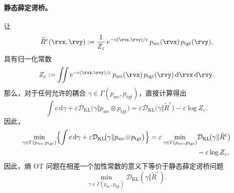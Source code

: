 \paragraph{静态薛定谔桥。}
让
\[
  \widetilde R^\varepsilon(\rvx,\rvy)
  := \frac{1}{Z_\varepsilon}\,e^{-c(\rvx,\rvy)/\varepsilon}\,p_{\mathrm{src}}(\rvx)\,p_{\mathrm{tgt}}(\rvy),
\]
具有归一化常数
\[
Z_\varepsilon := \iint e^{-c(\rvx, \rvy)/\varepsilon}\, p_{\mathrm{src}}(\rvx)\, p_{\mathrm{tgt}}(\rvy)\,\mathrm d\rvx\,\mathrm d\rvy.
\]
那么，对于任何允许的耦合 \(\gamma\in\Gamma(p_{\mathrm{src}},p_{\mathrm{tgt}})\)，直接计算得出
\[
\int c\, \mathrm d\gamma
+\varepsilon \mathcal{D}_\mathrm{KL}\!\bigl(\gamma \Vert p_{\mathrm{src}}\!\otimes\!p_{\mathrm{tgt}}\bigr)
=
\varepsilon \mathcal{D}_\mathrm{KL}\!\bigl(\gamma \Vert \widetilde R^\varepsilon\bigr)
-\varepsilon\log Z_\varepsilon.
\]
因此，
\begin{align}
\begin{aligned}\label{eq:eot-sb-static}
    \min_{\gamma\in\Gamma(p_{\mathrm{src}},p_{\mathrm{tgt}})}
  \Bigl\{\int c \,\mathrm d\gamma
  + \varepsilon \mathcal{D}_\mathrm{KL}\!\bigl(\gamma \Vert p_{\mathrm{src}}\!\otimes\!p_{\mathrm{tgt}}\bigr)\Bigr\}
  = \varepsilon \min_{\gamma\in\Gamma(p_{\mathrm{src}},p_{\mathrm{tgt}})}
  &\mathcal{D}_\mathrm{KL}\!\bigl(\gamma \Vert \widetilde R^\varepsilon\bigr)
  \\&-\varepsilon\log Z_\varepsilon,
\end{aligned}
\end{align}
因此，熵 OT 问题在相差一个加性常数的意义下等价于静态薛定谔桥问题
\[
\min_{\gamma\in\Gamma(p_{\mathrm{src}},p_{\mathrm{tgt}})}
\mathcal{D}_\mathrm{KL}(\gamma\Vert \widetilde R^\varepsilon).
\]

